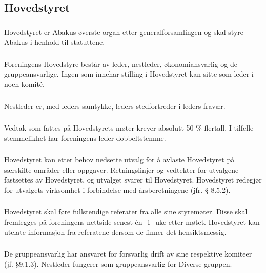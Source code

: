 \subsection{Hovedstyret}

\subsubsection{}
Hovedstyret er Abakus øverste organ etter generalforsamlingen og skal styre
Abakus i henhold til statuttene.

\subsubsection{}
Foreningens Hovedstyre består av leder, nestleder, økonomiansvarlig og de
gruppeansvarlige. Ingen som innehar stilling i Hovedstyret kan sitte som leder i noen komité.

\subsubsection{}
Nestleder er, med leders samtykke, leders stedfortreder i leders fravær.

\subsubsection{}
Vedtak som fattes på Hovedstyrets møter krever absolutt 50 \% flertall. I
tilfelle stemmelikhet har foreningens leder dobbeltstemme.

\subsubsection{}
Hovedstyret kan etter behov nedsette utvalg for å avlaste Hovedstyret på
særskilte områder eller oppgaver. Retningslinjer og vedtekter for utvalgene
fastsettes av Hovedstyret, og utvalget svarer til Hovedstyret. Hovedstyret
redegjør for utvalgets virksomhet i forbindelse med årsberetningene (jfr. §
8.5.2).

\subsubsection{}
Hovedstyret skal føre fullstendige referater fra alle sine styremøter. Disse
skal fremlegges på foreningens nettside senest én -1- uke etter møtet.
Hovedstyret kan utelate informasjon fra referatene dersom de finner det
hensiktsmessig.

\subsubsection{}
De gruppeansvarlig har ansvaret for forsvarlig drift av sine respektive komiteer (jf. §9.1.3).
Nestleder fungerer som gruppeansvarlig for Diverse-gruppen.

